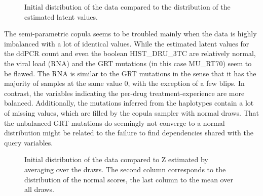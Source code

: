 \begin{figure}[H]
	\centering
	
	\caption{Initial distribution of the data compared to the distribution of the estimated latent values.}
	\label{fig:zscores}
\end{figure}
The semi-parametric copula seems to be troubled mainly when the data is highly imbalanced with a lot of identical values.
While the estimated latent values for the ddPCR count and even the boolean HIST\_DRU\_3TC are relatively normal,
the viral load (RNA) and the GRT mutations (in this case MU\_RT70) seem to be flawed.
The RNA is similar to the GRT mutations in the sense that it has the majority of samples at the same value $0$,
with the exception of a few blips.
In contrast, the variables indicating the per-drug treatment-experience are more balanced.
Additionally, the mutations inferred from the haplotypes contain a lot of missing values, which are filled by the copula sampler
with normal draws.
That the unbalanced GRT mutations do seemingly not converge to a normal distribution might be related to the failure to find dependencies shared with the query variables.

\begin{figure}
	\caption{Initial distribution of the data compared to Z estimated by averaging over the draws. The second column corresponds to the distribution of the normal scores, the last column to the mean over all draws.}
	\label{fig:zscores_bool}
\end{figure}
